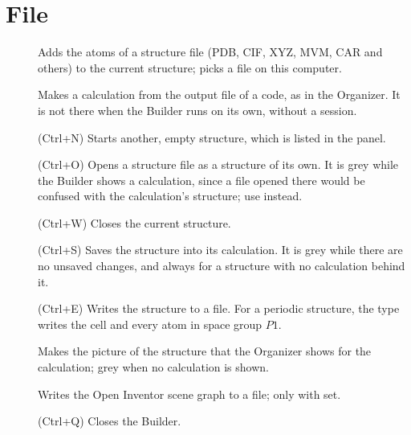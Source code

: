 \section{File}
\begin{description}
	\item[] Adds the atoms of a structure file (PDB, CIF, XYZ, MVM, CAR and others) to the current structure;  picks a file on this computer.
	\item[] Makes a calculation from the output file of a code, as in the Organizer. It is not there when the Builder runs on its own, without a session.
	\item[] (\textsf{Ctrl+N}) Starts another, empty structure, which is listed in the  panel.
	\item[] (\textsf{Ctrl+O}) Opens a structure file as a structure of its own. It is grey while the Builder shows a calculation, since a file opened there would be confused with the calculation's structure; use  instead.
	\item[] (\textsf{Ctrl+W}) Closes the current structure.
	\item[] (\textsf{Ctrl+S}) Saves the structure into its calculation. It is grey while there are no unsaved changes, and always for a structure with no calculation behind it.
	\item[] (\textsf{Ctrl+E}) Writes the structure to a file. For a periodic structure, the type  writes the cell and every atom in space group $P1$.
	\item[] Makes the picture of the structure that the Organizer shows for the calculation; grey when no calculation is shown.
	\item[] Writes the Open Inventor scene graph to a file; only with  set.
	\item[] (\textsf{Ctrl+Q}) Closes the Builder.
\end{description}

